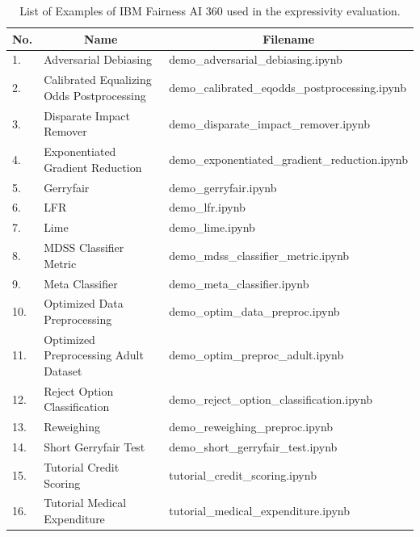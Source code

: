 \documentclass[final,5p,times,twocolumn]{elsarticle}
\begin{document}
\begin{table}[]
	\centering
	\caption{List of Examples of IBM Fairness AI 360 used in the expressivity evaluation.}
	\label{tab:list_of_examples}
	\begin{tabular}{lll}
		\hline
		\multicolumn{1}{c}{\textbf{No.}} & \multicolumn{1}{c}{\textbf{Name}}         & \multicolumn{1}{c}{\textbf{Filename}}          \\ \hline
		1.                               & Adversarial Debiasing                     & demo\_adversarial\_debiasing.ipynb             \\
		2.                               & Calibrated Equalizing Odds Postprocessing & demo\_calibrated\_eqodds\_postprocessing.ipynb \\
		3.                               & Disparate Impact Remover                  & demo\_disparate\_impact\_remover.ipynb         \\
		4.                               & Exponentiated Gradient Reduction          & demo\_exponentiated\_gradient\_reduction.ipynb \\
		5.                               & Gerryfair                                 & demo\_gerryfair.ipynb                          \\
		6.                               & LFR                                       & demo\_lfr.ipynb                                \\
		7.                               & Lime                                      & demo\_lime.ipynb                               \\
		8.                               & MDSS Classifier Metric                    & demo\_mdss\_classifier\_metric.ipynb           \\
		9.                               & Meta Classifier                           & demo\_meta\_classifier.ipynb                   \\
		10.                              & Optimized Data Preprocessing              & demo\_optim\_data\_preproc.ipynb               \\
		11.                              & Optimized Preprocessing Adult Dataset     & demo\_optim\_preproc\_adult.ipynb              \\
		12.                              & Reject Option Classification              & demo\_reject\_option\_classification.ipynb     \\
		13.                              & Reweighing                                & demo\_reweighing\_preproc.ipynb                \\
		14.                              & Short Gerryfair Test                      & demo\_short\_gerryfair\_test.ipynb             \\
		15.                              & Tutorial Credit Scoring                   & tutorial\_credit\_scoring.ipynb                \\
		16.                              & Tutorial Medical Expenditure              & tutorial\_medical\_expenditure.ipynb           \\ \hline
	\end{tabular}
\end{table}
\end{document}
